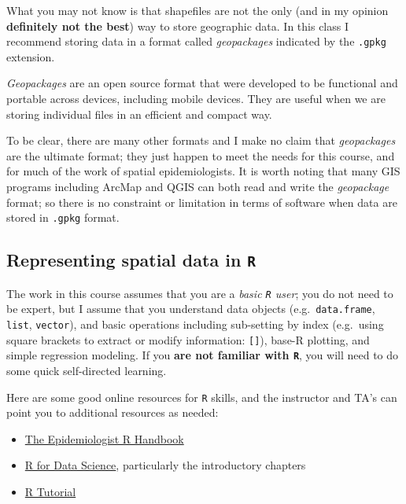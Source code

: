 \documentclass[
]{book}
\providecommand{\tightlist}{%
  \setlength{\itemsep}{0pt}\setlength{\parskip}{0pt}}
\newenvironment{rmdtip}[1]
  {
  \begin{itemize}
  \renewcommand{\labelitemi}{
    \raisebox{-.7\height}[0pt][0pt]{
      {\setkeys{Gin}{width=3em,keepaspectratio}\texttt{[image: images/\#1]}}
    }
  }
  \setlength{\fboxsep}{1em}
  \begin{tip}
  \item
  }
  {
  \end{tip}
  \end{itemize}
  }
\begin{document}
What you may not know is that shapefiles are not the only (and in my opinion \textbf{definitely not the best}) way to store geographic data. In this class I recommend storing data in a format called \emph{geopackages} indicated by the \texttt{.gpkg} extension.

\emph{Geopackages} are an open source format that were developed to be functional and portable across devices, including mobile devices. They are useful when we are storing individual files in an efficient and compact way.

To be clear, there are many other formats and I make no claim that \emph{geopackages} are the ultimate format; they just happen to meet the needs for this course, and for much of the work of spatial epidemiologists. It is worth noting that many GIS programs including ArcMap and QGIS can both read and write the \emph{geopackage} format; so there is no constraint or limitation in terms of software when data are stored in \texttt{.gpkg} format.

\hypertarget{representing-spatial-data-in-r}{%
\subsection{\texorpdfstring{Representing spatial data in \texttt{R}}{Representing spatial data in R}}\label{representing-spatial-data-in-r}}

The work in this course assumes that you are a \emph{basic \texttt{R} user}; you do not need to be expert, but I assume that you understand data objects (e.g.~\texttt{data.frame}, \texttt{list}, \texttt{vector}), and basic operations including sub-setting by index (e.g.~using square brackets to extract or modify information: \texttt{{[}{]}}), base-R plotting, and simple regression modeling. If you \textbf{are not familiar with \texttt{R}}, you will need to do some quick self-directed learning.

\begin{rmdtip}{tip}

Here are some good online resources for \texttt{R} skills, and the instructor and TA's can point you to additional resources as needed:

\begin{itemize}
\tightlist
\item
  \href{https://epirhandbook.com/index.html}{The Epidemiologist R Handbook}
\item
  \href{https://r4ds.had.co.nz/introduction.html}{R for Data Science}, particularly the introductory chapters
\item
  \href{http://www.r-tutor.com/r-introduction}{R Tutorial}
\end{itemize}

\end{rmdtip}
\end{document}
